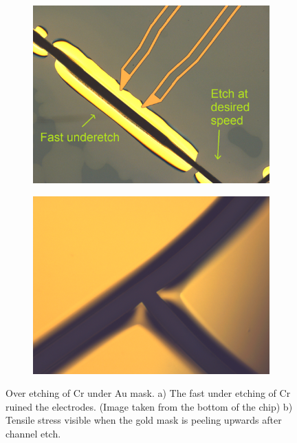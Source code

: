 \documentclass[final]{jyflluk}
\begin{document}
\begin{figure}[h]
    \centering
    \begin{subfigure}{0.48\textwidth}
        \centering
        \includegraphics[width=\linewidth]{optical/underetch01.png} 
        \caption{} \label{fig:lileee}
    \end{subfigure}
    \hfill
    \begin{subfigure}{0.48\textwidth}
        \centering
        \includegraphics[width=\linewidth]{optical/tensilestress.png} 
        \caption{} \label{fig:lellqqq}
    \end{subfigure}
    \caption{Over etching of Cr under Au mask. a) The fast under etching of Cr ruined the electrodes. (Image taken from the bottom of the chip) b) Tensile stress visible when the gold mask is peeling upwards after channel etch.} \label{fig:underetch}
\end{figure}  
\end{document}
